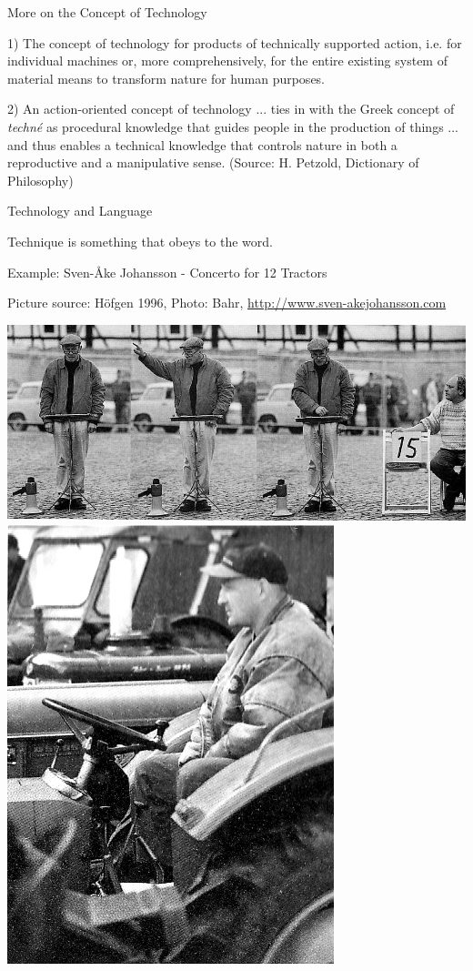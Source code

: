 \documentclass{beamer}
\begin{document}
\begin{frame}{More on the Concept of Technology}

1) The concept of technology for products of technically supported action,
i.e. for individual machines or, more comprehensively, for the entire existing
system of material means to transform nature for human purposes.

2) An action-oriented concept of technology ... ties in with the Greek concept
of \emph{techné} as procedural knowledge that guides people in the production
of things ... and thus enables a technical knowledge that controls nature in
both a reproductive and a manipulative sense. (Source: H. Petzold, Dictionary
of Philosophy)

\end{frame}

\begin{frame}{Technology and Language}

Technique is something that obeys to the word.

Example: Sven-Åke Johansson - Concerto for 12 Tractors

Picture source: Höfgen 1996, Photo: Bahr,
\url{http://www.sven-akejohansson.com}

\begin{center}
  \includegraphics[width=.74\textwidth]{6lxSq6.jpg}\hfill
  \includegraphics[width=.24\textwidth]{6barSY.jpg}
\end{center}

\end{frame}
\end{document}
